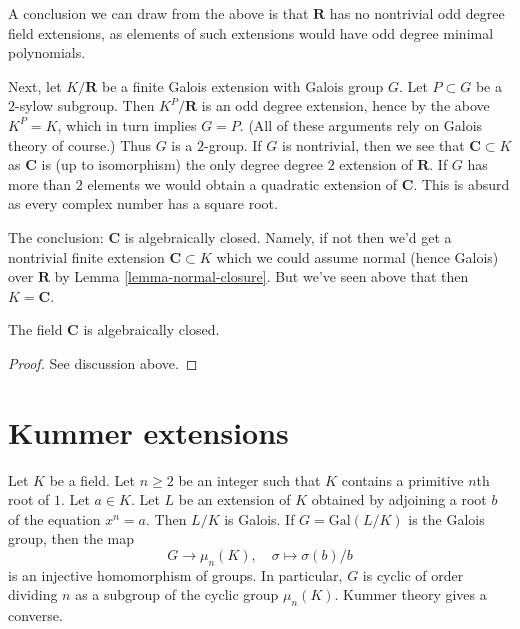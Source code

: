 \medskip\noindent
A conclusion we can draw from the above is that $\mathbf{R}$ has
no nontrivial odd degree field extensions, as elements of such extensions
would have odd degree minimal polynomials.

\medskip\noindent
Next, let $K/\mathbf{R}$ be a finite Galois extension with Galois group $G$.
Let $P \subset G$ be a $2$-sylow subgroup. Then $K^P/\mathbf{R}$ is an
odd degree extension, hence by the above $K^P = K$, which in turn implies
$G = P$. (All of these arguments rely on Galois theory of course.)
Thus $G$ is a $2$-group. If $G$ is nontrivial, then we see that
$\mathbf{C} \subset K$ as $\mathbf{C}$ is (up to isomorphism) the only degree
degree $2$ extension of $\mathbf{R}$. If $G$ has more than $2$ elements
we would obtain a quadratic extension of $\mathbf{C}$.
This is absurd as every complex number has a square root.

\medskip\noindent
The conclusion: $\mathbf{C}$ is algebraically closed. Namely, if not
then we'd get a nontrivial finite extension $\mathbf{C} \subset K$
which we could assume normal (hence Galois) over $\mathbf{R}$ by
Lemma \ref{lemma-normal-closure}. But we've seen above that then
$K = \mathbf{C}$.

\begin{lemma}
\label{lemma-C-algebraically-closed}
The field $\mathbf{C}$ is algebraically closed.
\end{lemma}

\begin{proof}
See discussion above.
\end{proof}





\section{Kummer extensions}
\label{section-Kummer}

\noindent
Let $K$ be a field. Let $n \geq 2$ be an integer such that $K$ contains
a primitive $n$th root of $1$. Let $a \in K$. Let $L$ be an extension
of $K$ obtained by adjoining a root $b$ of the equation $x^n = a$.
Then $L/K$ is Galois. If $G = \text{Gal}(L/K)$ is the Galois group, then
the map
$$
G \longrightarrow \mu_n(K),\quad \sigma \longmapsto \sigma(b)/b
$$
is an injective homomorphism of groups. In particular, $G$ is cyclic
of order dividing $n$ as a subgroup of the cyclic group $\mu_n(K)$.
Kummer theory gives a converse.

